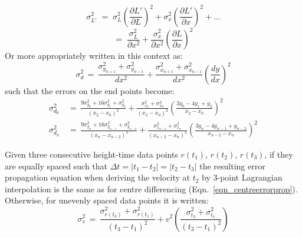 \documentclass[namedreferences]{SolarPhysics}
\begin{document}
\begin{article}
\begin{equation}
\sigma_{L'}^2 \; = \; \sigma_L^2 \left(\frac{\partial L'}{\partial L}\right)^2 + \sigma_x^2\left(\frac{\partial L'}{\partial x}\right)^2+...
\end{equation}
\begin{equation}
=\; \frac{\sigma_L^2}{\partial x^2}+\frac{\sigma_x^2}{\partial x^2}\left(\frac{\partial L}{\partial x}\right)^2
\end{equation}
Or more appropriately written in this context as:
\begin{equation}
\sigma_d^2 \,=\, \frac{\sigma_{y_{n+1}}^2+\sigma_{y_{n-1}}^2}{dx^2} + \frac{\sigma_{x_{n+1}}^2+\sigma_{x_{n-1}}^2}{dx^2}\left(\frac{dy}{dx}\right)^2
\end{equation}
such that the errors on the end points become:
\begin{eqnarray}
\sigma_{d_0}^2 \,&=\, \frac{9\sigma_{y_0}^2+16\sigma_{y_1}^2+\sigma_{y_2}^2}{\left(x_2-x_0\right)^2} + \frac{\sigma_{x_2}^2+\sigma_{x_0}^2}{\left(x_2-x_0\right)^2} \left( \frac{3y_0-4y_1+y_2}{x_2-x_0}\right)^2 \\
\sigma_{d_n}^2 \,&=\, \frac{9\sigma_{y_n}^2+16\sigma_{y_{n-1}}^2+\sigma_{y_{n-2}}^2}{\left(x_n-x_{n-2}\right)^2} + \frac{\sigma_{x_{n-2}}^2+\sigma_{x_n}^2}{\left(x_{n-2}-x_n\right)^2} \left( \frac{3y_n-4y_{n-1}+y_{n-2}}{x_{n-2}-x_n}\right)^2
\end{eqnarray}

Given three consecutive height-time data points $r(t_1)$, $r(t_2)$, $r(t_3)$, if they are equally spaced such that $\Delta t=|t_1-t_2|=|t_2-t_3|$ the resulting error propagation equation when deriving the velocity at $t_2$ by 3-point Lagrangian interpolation is the same as for centre differencing (Eqn.~\ref{eqn_centreerrorprop}). Otherwise, for unevenly spaced data points it is written:
\begin{equation}
\sigma_v^2 \,=\, \frac{\sigma_{r(t_3)}^2+\sigma_{r(t_1)}^2}{(t_3-t_1)^2} + v^2 \left( \frac{\sigma_{t_3}^2+\sigma_{t_1}^2}{(t_3-t_1)^2} \right)
\end{equation}



\end{article}
\end{document}
